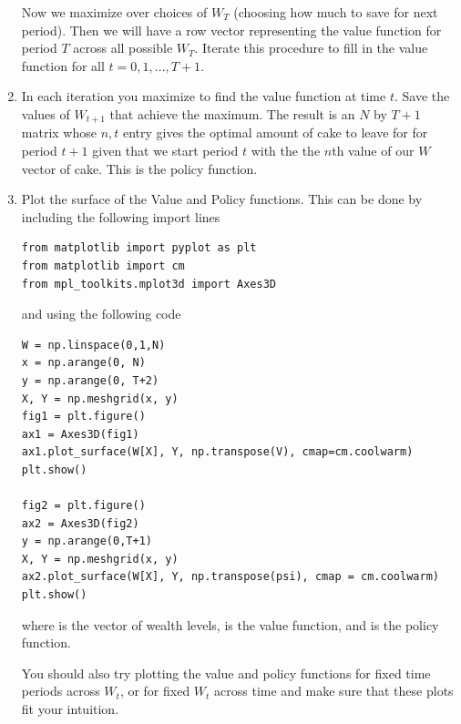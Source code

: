 \begin{problem}
\begin{enumerate}
Now we maximize over choices of $W_T$ (choosing how much to save for next period).  Then we will have a row vector 
representing the value function for period $T$ across all possible $W_T$.  Iterate this procedure to fill in the value 
function for all $t=0,1,\ldots, T+1$.

\item In each iteration you maximize to find the value function at time $t$.  Save the values of $W_{t+1}$ that achieve the 
maximum.  The result is an $N$ by $T+1$ matrix whose $n,t$ entry gives the optimal amount of cake to leave for for period 
$t+1$ given that we start period $t$ with the the $n$th value of our $W$ vector of cake.  This is the policy function.

\item Plot the surface of the Value and Policy functions.  This can be done by including the following import lines
\begin{lstlisting}
from matplotlib import pyplot as plt
from matplotlib import cm
from mpl_toolkits.mplot3d import Axes3D
\end{lstlisting}
and using the following code
\begin{lstlisting}
W = np.linspace(0,1,N)
x = np.arange(0, N)
y = np.arange(0, T+2)
X, Y = np.meshgrid(x, y)
fig1 = plt.figure()
ax1 = Axes3D(fig1)
ax1.plot_surface(W[X], Y, np.transpose(V), cmap=cm.coolwarm)
plt.show()

fig2 = plt.figure()
ax2 = Axes3D(fig2)
y = np.arange(0,T+1)
X, Y = np.meshgrid(x, y)
ax2.plot_surface(W[X], Y, np.transpose(psi), cmap = cm.coolwarm)
plt.show()
\end{lstlisting}
where  is the vector of wealth levels,  is the value function, and  is the policy function.

You should also try plotting the value and policy functions for fixed time periods across $W_t$, or for fixed $W_t$ across time and make sure that these plots fit your intuition.
\end{enumerate}
\end{problem}

